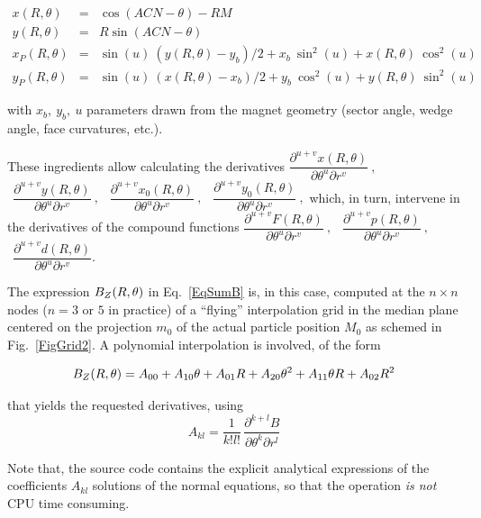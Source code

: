 \begin{eqnarray}
x(R,\theta)&=&\cos (ACN-\theta)-RM   \nonumber \\[-1ex]
y(R,\theta)&=&R\sin (ACN-\theta)   \nonumber \\[-1ex]
x_P(R,\theta)&=&\sin(u)\:  (y(R,\theta) - y_b)/2 + x_b\:  \sin^2(u) + x(R,\theta)\:  \cos^2(u)   \nonumber \\[-1ex]
y_P(R,\theta)&=&\sin(u)\: (x(R,\theta) - x_b)/2 + y_b\:  \cos^2(u) + y(R,\theta) \: \sin^2(u)   \nonumber 
\end{eqnarray}

\noindent with $x_b,~y_b,~u$ parameters drawn from the  magnet geometry (sector angle, wedge angle, face curvatures, etc.). 

\noindent These ingredients allow calculating  the derivatives 
$\dfrac{\partial^{ u+v}x(R,\theta)}{ \partial \theta^u\partial r^v}\:,$ 
$\:\: \dfrac{\partial^{ u+v}y(R,\theta)}{ \partial \theta^u\partial r^v}\:,$ 
$\:\:\dfrac{\partial^{ u+v}x_0(R,\theta)}{ \partial \theta^u\partial r^v}\:,$ 
$\:\:\dfrac{\partial^{ u+v}y_0(R,\theta)}{ \partial \theta^u\partial r^v}\:,$ 
which, in turn,  intervene in the derivatives of the compound functions 
$\dfrac{\partial^{ u+v}F(R,\theta)}{ \partial \theta^u\partial r^v}\:,$ 
$\:\:\dfrac{\partial^{ u+v}p(R,\theta)}{ \partial \theta^u\partial r^v}\:,$ 
$\:\:\dfrac{\partial^{ u+v}d(R,\theta)}{ \partial \theta^u\partial r^v}$. 


\bigskip

\label{InterpMeth}

\bigskip

\noindent The expression ${B_Z}(R,\theta)$ in Eq.~\ref{EqSumB} is, in this case, 
computed at  the $n\times n$ nodes  ($n=3$ or $5$ in practice)  
of a ``flying'' interpolation grid in the median plane centered on the projection $m_0$ of 
the actual particle position $M_0$ as schemed 
in Fig.~\ref{FigGrid2}. A polynomial interpolation is involved, of the form 

$${B_Z}(R,\theta) = A_{00} + A_{10}\theta + A_{01}R + A_{20}\theta^2 + A_{11}\theta R + A_{02} R^2 $$

\noindent  that yields the requested   derivatives, using 
$$	A_{kl} = \dfrac{1 }{ k!l!}\,  \dfrac{\partial^{ k+l}B }{ \partial \theta^k\partial r^l} $$

\noindent Note that, the source code contains the explicit analytical 
expressions of the coefficients $A_{kl}$ solutions of the normal 
equations, so that the operation {\it is not}   CPU time consuming. 

